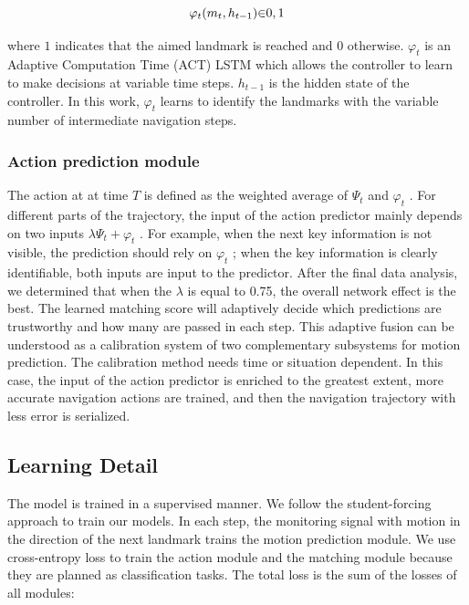 \begin{equation}
	\centering
	{\varphi}_{t}({m}_{t},{h}_{t-1}){\in}{{0},{1}}
\end{equation}

where ${1}$ indicates that the aimed landmark is reached and ${0}$ otherwise. ${{\varphi}_{t}}$ is an Adaptive Computation Time (ACT) LSTM which allows the controller to learn to make decisions at variable time steps. ${h}_{t-1}$ is the hidden state of the controller. In this work, ${{\varphi}_{t}}$ learns to identify the landmarks with the variable number of intermediate navigation steps.

\subsubsection{Action prediction module}
	
The action at at time ${T}$ is defined as the weighted average of ${{\Psi}_{t}}$ and ${{\varphi}_{t}}$ . For different parts of the trajectory, the input of the action predictor mainly depends on  two inputs ${{\lambda}{\Psi}_{t} + {\varphi}_{t}}$ . For example, when the next key information is not visible, the prediction should rely on ${{\varphi}_{t}}$ ; when the key information is clearly identifiable, both inputs are input to the predictor. After the final data analysis, we determined that when the ${\lambda}$  is equal to 0.75, the overall network effect is the best. The learned matching score will adaptively decide which predictions are trustworthy and how many are passed in each step. This adaptive fusion can be understood as a calibration system of two complementary subsystems for motion prediction. The calibration method needs time or situation dependent. In this case, the input of the action predictor is enriched to the greatest extent, more accurate navigation actions are trained, and then the navigation trajectory with less error is serialized.
	
\subsection{Learning Detail}
	
The model is trained in a supervised manner. We follow the student-forcing approach to train our models. In each step, the monitoring signal with motion in the direction of the next landmark trains the motion prediction module. We use cross-entropy loss to train the action module and the matching module because they are planned as classification tasks. The total loss is the sum of the losses of all modules:
	
